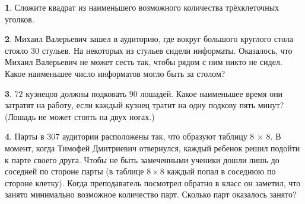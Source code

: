 \documentclass[b5paper,usehyperref, twoside]{article}
\theoremstyle{definition}
\theoremstyle{definition}
\newtheorem{Task}{}
\begin{document}
	\begin{Task}
		Сложите квадрат из наименьшего возможного количества трёхклеточных уголков. 
	\end{Task}
	
	
	\begin{Task}
		Михаил Валерьевич зашел в аудиторию, где вокруг большого круглого стола стояло 30 стульев. На некоторых из стульев сидели информаты. Оказалось, что Михаил Валерьевич не может сесть так, чтобы рядом с ним никто не сидел. Какое наименьшее число информатов могло быть за столом?
	\end{Task}
	
	
	\begin{Task} 
		$72$ кузнецов должны подковать $90$ лошадей. Какое наименьшее время они затратят на работу, если каждый кузнец тратит на одну подкову пять минут? (Лошадь не может стоять на двух ногах.)
	\end{Task}

	\begin{Task}
		Парты в 307 аудитории расположены так, что образуют таблицу 8 × 8.
		В момент, когда Тимофей Дмитриевич отвернулся, каждый ребенок решил
		подойти к парте своего друга. Чтобы не быть замеченными ученики дошли лишь до соседней по стороне парты (в таблице $8\times 8$ каждый попал в соседнюю по стороне клетку). Когда преподаватель посмотрел обратно в класс он заметил, что занято минимально возможное количество парт. Сколько парт оказалось занято?
	\end{Task}
	
	
\end{document}
